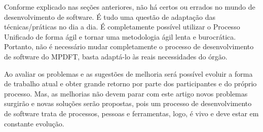 \documentclass[
	article,			%
	11pt,				%
	oneside,			%
	a4paper,			%
	english,			%
	brazil,				%
	sumario=tradicional
	]{abntex2}
\begin{document}
Conforme explicado nas seções anteriores, não há certos ou errados no mundo de
desenvolvimento de software. É tudo uma questão de adaptação das
técnicas/práticas no dia a dia. É completamente possível utilizar o Processo
Unificado de forma ágil e tornar uma metodologia ágil lenta e burocrática.
Portanto, não é necessário mudar completamente o processo de desenvolvimento de
software do MPDFT, basta adaptá-lo às reais necessidades do órgão.

Ao avaliar os problemas e as sugestões de melhoria será possível evoluir a forma
de trabalho atual e obter grande retorno por parte dos participantes e do
próprio processo. Mas, as melhorias não devem parar com este artigo novos
problemas surgirão e novas soluções serão propostas, pois um processo de
desenvolvimento de software trata de processos, pessoas e ferramentas, logo, é
vivo e deve estar em constante evolução.

\postextual


\end{document}
